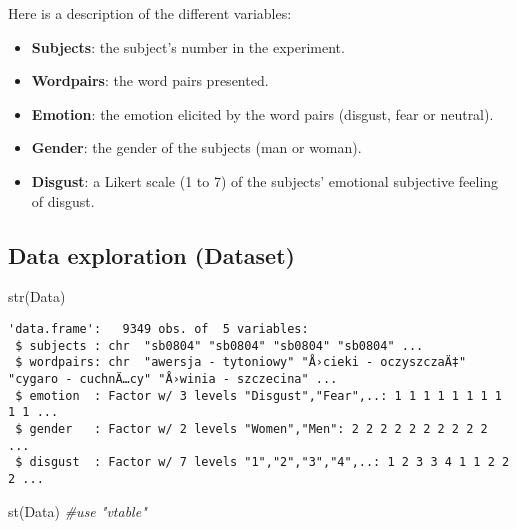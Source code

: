 \documentclass[
]{article}
\newenvironment{Shaded}{\begin{snugshade}}{\end{snugshade}}
\newcommand{\CommentTok}[1]{\textcolor[rgb]{0.56,0.35,0.01}{\textit{#1}}}
\newcommand{\FunctionTok}[1]{\textcolor[rgb]{0.00,0.00,0.00}{#1}}
\newcommand{\NormalTok}[1]{#1}
\begin{document}
Here is a description of the different variables:

\begin{itemize}
\item
  \textbf{Subjects}: the subject's number in the experiment.
\item
  \textbf{Wordpairs}: the word pairs presented.
\item
  \textbf{Emotion}: the emotion elicited by the word pairs (disgust,
  fear or neutral).
\item
  \textbf{Gender}: the gender of the subjects (man or woman).
\item
  \textbf{Disgust}: a Likert scale (1 to 7) of the subjects' emotional
  subjective feeling of disgust.
\end{itemize}

\hypertarget{data-exploration-dataset}{%
\subsection{Data exploration (Dataset)}\label{data-exploration-dataset}}

\begin{Shaded}
\begin{Highlighting}[]
\FunctionTok{str}\NormalTok{(Data)}
\end{Highlighting}
\end{Shaded}

\begin{verbatim}
'data.frame':   9349 obs. of  5 variables:
 $ subjects : chr  "sb0804" "sb0804" "sb0804" "sb0804" ...
 $ wordpairs: chr  "awersja - tytoniowy" "Å›cieki - oczyszczaÄ‡" "cygaro - cuchnÄ…cy" "Å›winia - szczecina" ...
 $ emotion  : Factor w/ 3 levels "Disgust","Fear",..: 1 1 1 1 1 1 1 1 1 1 ...
 $ gender   : Factor w/ 2 levels "Women","Men": 2 2 2 2 2 2 2 2 2 2 ...
 $ disgust  : Factor w/ 7 levels "1","2","3","4",..: 1 2 3 3 4 1 1 2 2 2 ...
\end{verbatim}

\begin{Shaded}
\begin{Highlighting}[]
\FunctionTok{st}\NormalTok{(Data) }\CommentTok{\#use "vtable"}
\end{Highlighting}
\end{Shaded}
\end{document}
